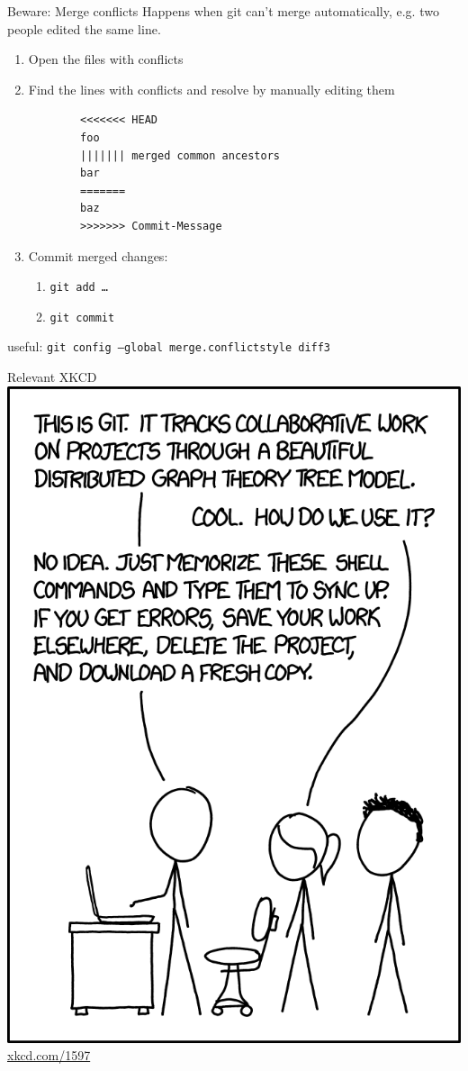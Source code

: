 \begin{frame}[fragile]{Beware: Merge conflicts}
  Happens when git can't merge automatically, e.g. two people edited the same line.

  \begin{enumerate}
    \item Open the files with conflicts
    \item Find the lines with conflicts and resolve by manually editing them
      \begin{verbatim}
        <<<<<<< HEAD
        foo
        ||||||| merged common ancestors
        bar
        =======
        baz
        >>>>>>> Commit-Message
\end{verbatim}
    \item Commit merged changes:
      \begin{enumerate}
        \item \texttt{git add …}
        \item \texttt{git commit}
      \end{enumerate}
  \end{enumerate}
  useful: \texttt{git config --global merge.conflictstyle diff3}
\end{frame}

\begin{frame}[t]{Relevant XKCD}
  \vspace{-1.5ex}
  \centering
  \includegraphics[height=\textheight]{images/xkcd.png}
  \href{https://xkcd.com/1597}{xkcd.com/1597}
\end{frame}

